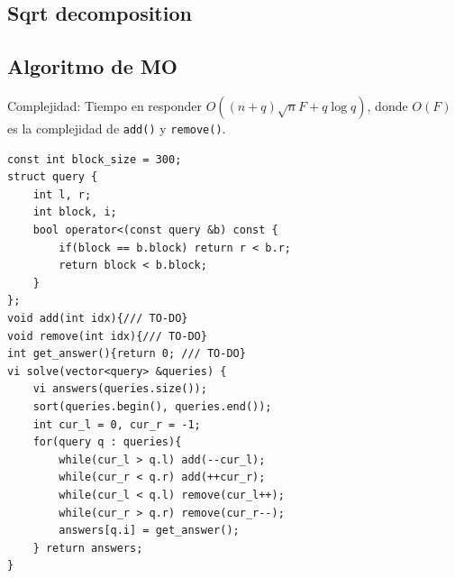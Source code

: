 \documentclass[12 pts,spanish,mexico]{article}
\numberwithin{equation}{section}
\begin{document}
\begin{multicols}{2}
\section{Sqrt decomposition}
\subsection{Algoritmo de MO}
Complejidad: Tiempo en responder $O((n + q)\sqrt{n}F + q\log q)$, donde $O(F)$ es la complejidad de \texttt{add()} y \texttt{remove()}.
\begin{verbatim}
const int block_size = 300;
struct query {
    int l, r;
    int block, i;
    bool operator<(const query &b) const {
        if(block == b.block) return r < b.r;
        return block < b.block;
    }
};
void add(int idx){/// TO-DO}
void remove(int idx){/// TO-DO}
int get_answer(){return 0; /// TO-DO}
vi solve(vector<query> &queries) {
    vi answers(queries.size());
    sort(queries.begin(), queries.end());
    int cur_l = 0, cur_r = -1;
    for(query q : queries){
        while(cur_l > q.l) add(--cur_l);
        while(cur_r < q.r) add(++cur_r);
        while(cur_l < q.l) remove(cur_l++);
        while(cur_r > q.r) remove(cur_r--);
        answers[q.i] = get_answer();
    } return answers;
}
\end{verbatim}



\end{multicols}
\end{document}
